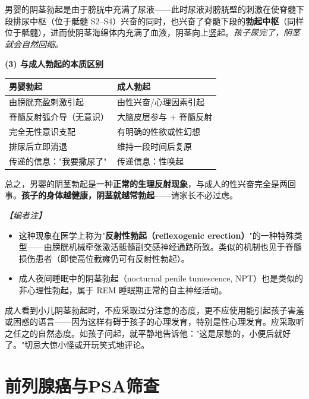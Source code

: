 \begin{enumerate}
男婴的阴茎勃起是由于膀胱中充满了尿液——此时尿液对膀胱壁的刺激在使脊髓下段排尿中枢（位于骶髓 S2--S4）兴奋的同时，也兴奋了脊髓下段的\textbf{勃起中枢}（同样位于骶髓），进而使阴茎海绵体内充满了血液，阴茎向上竖起。\textit{孩子尿完了，阴茎就会自然回缩。}

\vspace{0.3em}
\noindent\textbf{(3) 与成人勃起的本质区别}

\begin{tabular}{|p{5cm}|p{6cm}|}
\hline
\textbf{男婴勃起} & \textbf{成人勃起} \\
\hline
由膀胱充盈刺激引起 & 由性兴奋/心理因素引起 \\
\hline
脊髓反射弧介导（无意识） & 大脑皮层参与 + 脊髓反射 \\
\hline
完全无性意识支配 & 有明确的性欲或性幻想 \\
\hline
排尿后立即消退 & 维持一段时间后复原 \\
\hline
传递的信息："我要撒尿了" & 传递信息：性唤起 \\
\hline
\end{tabular}

总之，男婴的阴茎勃起是一种\textbf{正常的生理反射现象}，与成人的性兴奋完全是两回事。\textbf{孩子的身体越健康，阴茎就越常勃起}——请家长不必过虑。

\vspace{0.3em}
\noindent\textit{【编者注】}
\begin{itemize}
	\item 这种现象在医学上称为"\textbf{反射性勃起（reflexogenic erection）}"的一种特殊类型——由膀胱机械牵张激活骶髓副交感神经通路所致。类似的机制也见于脊髓损伤患者（即使高位截瘫仍可有反射性勃起）。
	\item 成人夜间睡眠中的阴茎勃起（nocturnal penile tumescence, NPT）也是类似的非心理性勃起，属于 REM 睡眠期正常的自主神经活动。
\end{itemize}

\begin{tcolorbox}[colback=pink!5!white,colframe=red!50!black,title=贴心小叮咛]
成人看到小儿阴茎勃起时，不应采取过分注意的态度，更不应使用能引起孩子害羞或困惑的语言——因为这样有碍于孩子的心理发育，特别是性心理发育。应采取听之任之的自然态度。如孩子问起，就平静地告诉他："这是尿憋的，小便后就好了。"切忌大惊小怪或开玩笑式地评论。
\end{tcolorbox}

\section{前列腺癌与PSA筛查}
\label{sec:prostate_cancer}


\end{enumerate}
